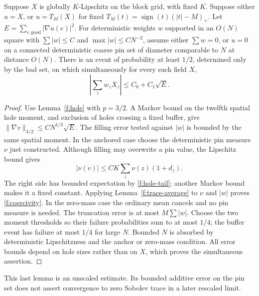 \begin{lemma}\label{f:average-coercivity}
Suppose $X$ is globally $K$-Lipschitz on the block grid, with fixed $K$.
Suppose either $u=X$, or $u=T_M(X)$ for fixed
$T_M(t)=\operatorname{sign}(t)(|t|-M)_+$. Let
$E=\sum_{e\text{ good}}|\nabla u(e)|^2$. For deterministic weights $w$
supported in an $O(N)$ square with $\sum|w|\le C$ and
$\max|w|\le CN^{-2}$, assume either $\sum w=0$, or $u=0$ on a connected
deterministic coarse pin set of diameter comparable to $N$ at distance
$O(N)$. There is an event of probability at least $1/2$, determined only
by the bad set, on which simultaneously for every such field $X$,
\begin{equation}\label{f:coercivity}
 \left|\sum_z w_zX_z\right|\le C_0+C_1\sqrt E.
\end{equation}
\end{lemma}
\begin{proof}
Use Lemma~\ref{f:hole} with $p=3/2$. A Markov bound on the twelfth spatial
hole moment, and exclusion of holes crossing a fixed buffer, give
$\|\nabla v\|_{3/2}\le CN^{1/3}\sqrt E$. The filling error tested against
$|w|$ is bounded by the same spatial moment. In the anchored case choose
the deterministic pin measure $\nu$ just constructed. Although filling
may overwrite a pin value, the Lipschitz bound gives
\[
 |\nu(v)|\le CK\sum_z\nu(z)(1+d_z).
\]
The right side has bounded expectation by \eqref{f:hole-tail}; another
Markov bound makes it a fixed constant. Applying
Lemma~\ref{f:trace-average} to $\nu$ and $|w|$ proves
\eqref{f:coercivity}. In the zero-mass case the ordinary mean cancels and
no pin measure is needed. The truncation error is at most $M\sum|w|$.
Choose the two moment thresholds so their failure probabilities sum to
at most $1/4$; the buffer event has failure at most $1/4$ for large $N$.
Bounded $N$ is absorbed by deterministic Lipschitzness and the anchor or
zero-mass condition. All error bounds depend on hole sizes rather than
on $X$, which proves the simultaneous assertion.
\end{proof}

This last lemma is an unscaled estimate. Its bounded additive error on
the pin set does not assert convergence to zero Sobolev trace in a later
rescaled limit.

